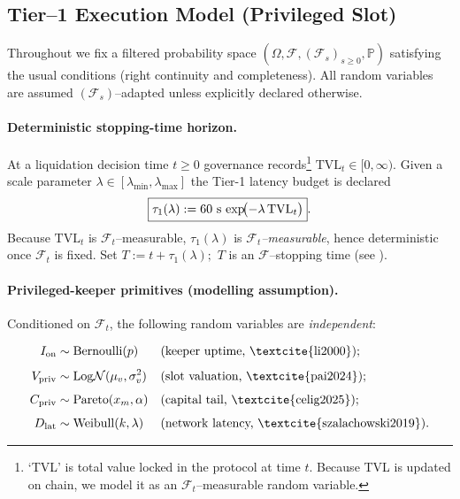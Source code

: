 \documentclass[11pt]{article}
\begin{document}
\subsection{Tier–1 Execution Model (Privileged Slot)}
\label{subsec:tier1}

Throughout we fix a filtered probability space
$(\Omega,\mathcal F,(\mathcal F_s)_{s\ge0},\mathbb P)$ satisfying the
usual conditions (right continuity and completeness).
All random variables are assumed $(\mathcal F_s)$–adapted unless
explicitly declared otherwise.

\paragraph{Deterministic stopping-time horizon.}
At a liquidation decision time $t\!\ge0$ governance
records\footnote{%
`TVL' is total value locked in the protocol at time $t$.  Because TVL
is updated on chain, we model it as an $\mathcal F_t$–measurable
random variable.}
\(
   \mathrm{TVL}_t\in[0,\infty).
\)
Given a scale parameter
$\lambda\!\in[\lambda_{\min},\lambda_{\max}]$ the Tier-1 latency
budget is declared
\[
   \boxed{%
     \tau_1(\lambda)
       := 60 \text{ s}\,
          \exp\!\bigl(-\lambda\,\mathrm{TVL}_t\bigr)
   }.
\]
Because $\mathrm{TVL}_t$ is $\mathcal F_t$–measurable,
$\tau_1(\lambda)$ is \emph{$\mathcal F_t$–measurable}, hence
deterministic once $\mathcal F_t$ is fixed.  Set
\(
   T := t+\tau_1(\lambda);
\)
$T$ is an $\mathcal F$–stopping time
(see \textcite[Ex.\ 3.3.3]{karatzas1991}).

\paragraph{Privileged-keeper primitives (modelling assumption).}
Conditioned on $\mathcal F_t$, the following random variables are
\emph{independent}:

\[
\begin{aligned}
I_{\mathrm{on}}
   &\sim \mathrm{Bernoulli}(p)
   &&\text{(keeper uptime, \textcite{li2000});}\\[4pt]
V_{\mathrm{priv}}
   &\sim \mathrm{Log\mathcal N}(\mu_v,\sigma_v^2)
   &&\text{(slot valuation, \textcite{pai2024});}\\[4pt]
C_{\mathrm{priv}}
   &\sim \mathrm{Pareto}(x_m,\alpha)
   &&\text{(capital tail, \textcite{celig2025});}\\[4pt]
D_{\mathrm{lat}}
   &\sim \mathrm{Weibull}(k,\lambda)
   &&\text{(network latency, \textcite{szalachowski2019}).}
\end{aligned}
\]
\end{document}
